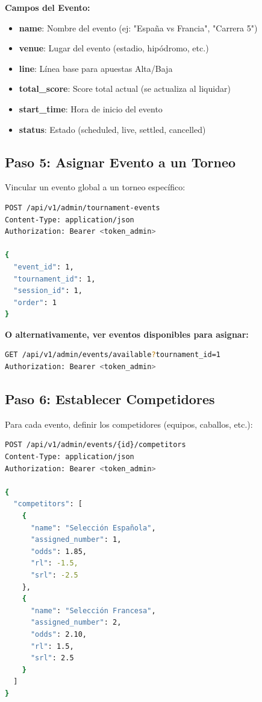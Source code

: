 \documentclass[12pt,a4paper]{article}
\begin{document}
\textbf{Campos del Evento:}
\begin{itemize}
    \item \textbf{name}: Nombre del evento (ej: "España vs Francia", "Carrera 5")
    \item \textbf{venue}: Lugar del evento (estadio, hipódromo, etc.)
    \item \textbf{line}: Línea base para apuestas Alta/Baja
    \item \textbf{total\_score}: Score total actual (se actualiza al liquidar)
    \item \textbf{start\_time}: Hora de inicio del evento
    \item \textbf{status}: Estado (scheduled, live, settled, cancelled)
\end{itemize}

\subsection{Paso 5: Asignar Evento a un Torneo}
Vincular un evento global a un torneo específico:

\begin{lstlisting}[language=bash]
POST /api/v1/admin/tournament-events
Content-Type: application/json
Authorization: Bearer <token_admin>

{
  "event_id": 1,
  "tournament_id": 1,
  "session_id": 1,
  "order": 1
}
\end{lstlisting}

\textbf{O alternativamente, ver eventos disponibles para asignar:}
\begin{lstlisting}[language=bash]
GET /api/v1/admin/events/available?tournament_id=1
Authorization: Bearer <token_admin>
\end{lstlisting}

\subsection{Paso 6: Establecer Competidores}
Para cada evento, definir los competidores (equipos, caballos, etc.):

\begin{lstlisting}[language=bash]
POST /api/v1/admin/events/{id}/competitors
Content-Type: application/json
Authorization: Bearer <token_admin>

{
  "competitors": [
    {
      "name": "Selección Española",
      "assigned_number": 1,
      "odds": 1.85,
      "rl": -1.5,
      "srl": -2.5
    },
    {
      "name": "Selección Francesa", 
      "assigned_number": 2,
      "odds": 2.10,
      "rl": 1.5,
      "srl": 2.5
    }
  ]
}
\end{lstlisting}
\end{document}
